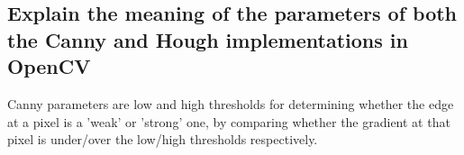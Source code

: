 \documentclass{article}
\begin{document}
 \quad
{} \par


\subsection{Explain the meaning of the parameters of both the Canny and Hough implementations in OpenCV}
Canny parameters are low and high thresholds for determining whether the edge at a pixel is a 'weak' or 'strong' one, by comparing whether the gradient at that pixel is under/over the low/high thresholds respectively.
\end{document}

